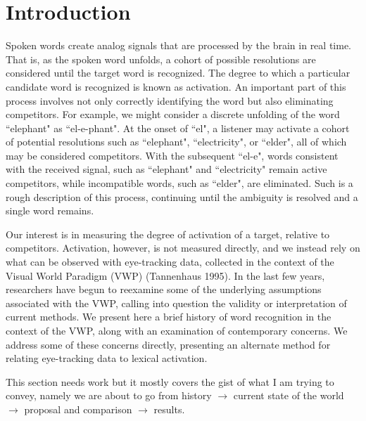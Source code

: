 \documentclass{article}
\begin{document}
\section{Introduction}

Spoken words create analog signals that are processed by the brain in real time. That is, as the spoken word unfolds, a cohort of possible resolutions are considered until the target word is recognized. The degree to which a particular candidate word is recognized is known as activation. An important part of this process involves not only correctly identifying the word but also eliminating competitors. For example, we might consider a discrete unfolding of the word ``elephant" as ``el-e-phant". At the onset of ``el", a listener may activate a cohort of potential resolutions such as ``elephant", ``electricity", or ``elder", all of which may be considered competitors. With the subsequent ``el-e", words consistent with the received signal, such as ``elephant" and ``electricity" remain active competitors, while incompatible words, such as ``elder", are eliminated. Such is a rough description of this process, continuing until the ambiguity is resolved and a single word remains.



Our interest is in measuring the degree of activation of a target, relative to competitors. Activation, however, is not measured directly, and we instead rely on what can be observed with eye-tracking data, collected in the context of the Visual World Paradigm (VWP) (Tannenhaus 1995). In the last few years, researchers have begun to reexamine some of the underlying assumptions associated with the VWP, calling into question the validity or interpretation of current methods. We present here a brief history of word recognition in the context of the VWP, along with an examination of contemporary concerns. We address some of these concerns directly, presenting an alternate method for relating eye-tracking data to lexical activation.


This section needs work but it mostly covers the gist of what I am trying to convey, namely we are about to go from history $\rightarrow$ current state of the world $\rightarrow$ proposal and comparison $\rightarrow$ results.

\end{document}
